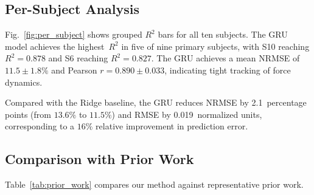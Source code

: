 \documentclass[journal]{IEEEtran}
\begin{document}
\subsection{Per-Subject Analysis}

Fig.~\ref{fig:per_subject} shows grouped $R^2$ bars for all ten subjects.
The GRU model achieves the highest~$R^2$ in five of nine primary subjects,
with S10 reaching $R^2 = 0.878$ and S6 reaching $R^2 = 0.827$.  The GRU
achieves a mean NRMSE of $11.5 \pm 1.8\%$ and Pearson $r = 0.890 \pm
0.033$, indicating tight tracking of force dynamics.

Compared with the Ridge baseline, the GRU reduces NRMSE by 2.1~percentage
points (from $13.6\%$ to $11.5\%$) and RMSE by 0.019~normalized units,
corresponding to a $16\%$ relative improvement in prediction error.

\subsection{Comparison with Prior Work}

Table~\ref{tab:prior_work} compares our method against representative
prior work.
\end{document}
